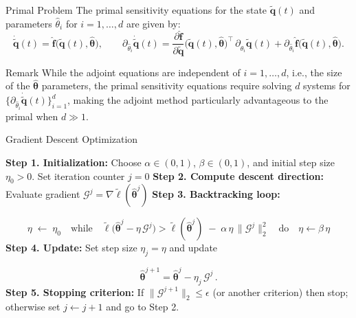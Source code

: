 \begin{frame}{Primal Problem}
  The \textcolor{codeblue}{primal} sensitivity equations for the state $\tilde{\mathbf{q}}(t)$ and parameters $\hat{\theta}_i$ for $i=1,\dots,d$ are given by:
    $$\dot{\tilde{\mathbf{q}}}(t)
      = \hat{\mathbf{f}}\bigl(\tilde{\mathbf{q}}(t),\hat{\bm{\theta}}\bigr),
      \qquad
      \partial_{\hat{\theta}_i}\dot{\tilde{\mathbf{q}}}(t)
      = \frac{\partial \hat{\mathbf{f}}}{\partial \tilde{\mathbf{q}}}
        \bigl(\tilde{\mathbf{q}}(t),\hat{\bm{\theta}}\bigr)^{\!\top}
        \,\partial_{\hat{\theta}_i}\tilde{\mathbf{q}}(t)
      + \partial_{\hat{\theta}_i}\hat{\mathbf{f}}
        \bigl(\tilde{\mathbf{q}}(t),\hat{\bm{\theta}}\bigr).$$

  \begin{block}{Remark}
    While the adjoint equations are independent of $i=1,\dots, d$, i.e., the size of the $\hat{\bm{\theta}}$ parameters, the primal sensitivity equations require solving $d$ systems for 
    $\{\partial_{\hat{\theta}_i} \dot{\tilde{\mathbf{q}}}(t)\}_{i=1}^d$, making the adjoint method particularly advantageous to the primal when $d \gg 1$.
  \end{block}
\end{frame}



\begin{frame}{Gradient Descent Optimization}
    
\begin{center}
\begin{minipage}{0.95\textwidth}
\LinesNotNumbered
\begin{algorithm}[H]
\label{algorithm_1}
\SetAlgoLined
\caption{Armijo Backtracking Line Search + Gradient Descent}
\textbf{Step 1. Initialization:} Choose $\alpha\in(0,1)$, $\beta\in(0,1)$, and initial step size $\eta_{0} > 0$. Set iteration counter $j=0$\;
\textbf{Step 2. Compute descent direction:} Evaluate gradient $\mathscr{G}^j = \nabla \tilde\ell(\hat{\bm\theta}^j)$\;
\textbf{Step 3. Backtracking loop:}

$$\eta \;\leftarrow\;\eta_{0}
    \quad\text{while}\quad
    \tilde\ell\bigl(\hat{\bm\theta}^j - \eta\,\mathscr{G}^j\bigr)
    >
    \tilde\ell(\hat{\bm\theta}^j)
    \;-\;\alpha\,\eta\,\|\mathscr{G}^j\|_2^2
    \quad\text{do}\quad
    \eta \leftarrow \beta\,\eta$$
\textbf{Step 4. Update:} Set step size $\eta_j = \eta$ and update

$$\hat{\bm\theta}^{j+1} = \hat{\bm\theta}^j - \eta_j\,\mathscr{G}^j\,.$$
\textbf{Step 5. Stopping criterion:} If $\|\mathscr{G}^{j+1}\|_2\le\epsilon$ (or another criterion) then stop; otherwise set $j\leftarrow j+1$ and go to Step 2.
\end{algorithm}
\end{minipage}
\end{center}

\end{frame}


